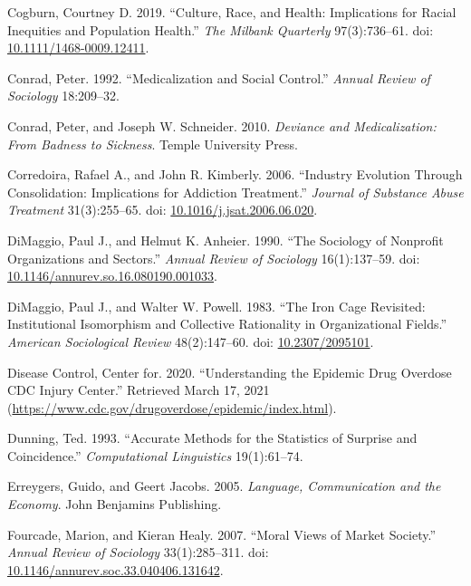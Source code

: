 \documentclass[
  12pt,
]{article}
\begin{document}
\leavevmode\hypertarget{ref-cogburn2019}{}%
Cogburn, Courtney D. 2019. ``Culture, Race, and Health: Implications for Racial Inequities and Population Health.'' \emph{The Milbank Quarterly} 97(3):736--61. doi: \href{https://doi.org/10.1111/1468-0009.12411}{10.1111/1468-0009.12411}.

\leavevmode\hypertarget{ref-conrad1992}{}%
Conrad, Peter. 1992. ``Medicalization and Social Control.'' \emph{Annual Review of Sociology} 18:209--32.

\leavevmode\hypertarget{ref-conrad2010}{}%
Conrad, Peter, and Joseph W. Schneider. 2010. \emph{Deviance and Medicalization: From Badness to Sickness}. Temple University Press.

\leavevmode\hypertarget{ref-corredoira2006}{}%
Corredoira, Rafael A., and John R. Kimberly. 2006. ``Industry Evolution Through Consolidation: Implications for Addiction Treatment.'' \emph{Journal of Substance Abuse Treatment} 31(3):255--65. doi: \href{https://doi.org/10.1016/j.jsat.2006.06.020}{10.1016/j.jsat.2006.06.020}.

\leavevmode\hypertarget{ref-dimaggio1990}{}%
DiMaggio, Paul J., and Helmut K. Anheier. 1990. ``The Sociology of Nonprofit Organizations and Sectors.'' \emph{Annual Review of Sociology} 16(1):137--59. doi: \href{https://doi.org/10.1146/annurev.so.16.080190.001033}{10.1146/annurev.so.16.080190.001033}.

\leavevmode\hypertarget{ref-dimaggio1983}{}%
DiMaggio, Paul J., and Walter W. Powell. 1983. ``The Iron Cage Revisited: Institutional Isomorphism and Collective Rationality in Organizational Fields.'' \emph{American Sociological Review} 48(2):147--60. doi: \href{https://doi.org/10.2307/2095101}{10.2307/2095101}.

\leavevmode\hypertarget{ref-centerfordiseasecontrol2020}{}%
Disease Control, Center for. 2020. ``Understanding the Epidemic \textbar{} Drug Overdose \textbar{} CDC Injury Center.'' Retrieved March 17, 2021 (\url{https://www.cdc.gov/drugoverdose/epidemic/index.html}).

\leavevmode\hypertarget{ref-dunning1993}{}%
Dunning, Ted. 1993. ``Accurate Methods for the Statistics of Surprise and Coincidence.'' \emph{Computational Linguistics} 19(1):61--74.

\leavevmode\hypertarget{ref-erreygers2005}{}%
Erreygers, Guido, and Geert Jacobs. 2005. \emph{Language, Communication and the Economy}. John Benjamins Publishing.

\leavevmode\hypertarget{ref-fourcade2007}{}%
Fourcade, Marion, and Kieran Healy. 2007. ``Moral Views of Market Society.'' \emph{Annual Review of Sociology} 33(1):285--311. doi: \href{https://doi.org/10.1146/annurev.soc.33.040406.131642}{10.1146/annurev.soc.33.040406.131642}.
\end{document}
